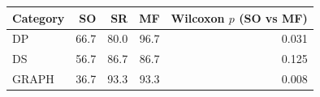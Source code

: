 \begin{tabular}{@{}lrrrr@{}}
\toprule
Category & SO & SR & MF & Wilcoxon $p$ (SO vs MF) \\
\midrule
DP & 66.7 & 80.0 & 96.7 & 0.031 \\
DS & 56.7 & 86.7 & 86.7 & 0.125 \\
GRAPH & 36.7 & 93.3 & 93.3 & 0.008 \\
\bottomrule
\end{tabular}
